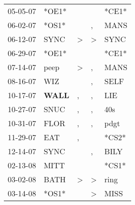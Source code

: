 \begin{supertabular}{p{0.07\textwidth}p{0.06\textwidth}p{0.02\textwidth}p{0.02\textwidth}p{0.06\textwidth}}
          05-05-07\textsuperscript{} &                            *OE1* &                  &                  &                            *CE1* \\
          06-02-07\textsuperscript{} &                            *OS1* &                  &                , &           MANS\textsuperscript{} \\
          06-12-07\textsuperscript{} &           SYNC\textsuperscript{} &     \textgreater &     \textgreater &           SYNC\textsuperscript{} \\
          06-29-07\textsuperscript{} &                            *OE1* &                  &                  &                            *CE1* \\
          07-14-07\textsuperscript{} &           peep\textsuperscript{} &     \textgreater &                , &           MANS\textsuperscript{} \\
          08-16-07\textsuperscript{} &            WIZ\textsuperscript{} &                  &                , &           SELF\textsuperscript{} \\
          10-17-07\textsuperscript{} &  \textbf{WALL\textsuperscript{}} &                , &                , &            LIE\textsuperscript{} \\
          10-27-07\textsuperscript{} &           SNUC\textsuperscript{} &                , &                , &            40s\textsuperscript{} \\
          10-31-07\textsuperscript{} &           FLOR\textsuperscript{} &                , &                , &           pdgt\textsuperscript{} \\
          11-29-07\textsuperscript{} &            EAT\textsuperscript{} &                , &                  &                            *CS2* \\
          12-14-07\textsuperscript{} &           SYNC\textsuperscript{} &                  &                , &           BILY\textsuperscript{} \\
          02-13-08\textsuperscript{} &           MITT\textsuperscript{} &                  &                  &                            *CS1* \\
          03-02-08\textsuperscript{} &           BATH\textsuperscript{} &     \textgreater &     \textgreater &           ring\textsuperscript{} \\
          03-14-08\textsuperscript{} &                            *OS1* &                  &     \textgreater &           MISS\textsuperscript{} \\

\end{supertabular}
